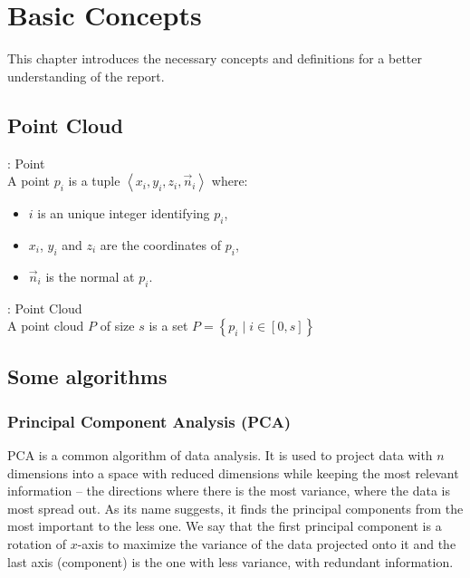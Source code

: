 \chapter{Basic Concepts}
\label{ch:background}
This chapter introduces the necessary concepts and definitions for a better understanding of the report.

\section{Point Cloud}
\begin{definition}{: Point}
  \\A point $p_i$ is a tuple $\left\langle x_i, y_i, z_i, \vec{n}_i \right\rangle$ where:
  \begin{itemize}
    \item $i$ is an unique integer identifying $p_i$,
    \item $x_i$, $y_i$ and $z_i$ are the coordinates of $p_i$,
    \item $\vec{n}_i$ is the normal at $p_i$.
  \end{itemize}
\end{definition}

\begin{definition}{: Point Cloud}
  \\A point cloud $P$ of size $s$ is a set $P = \left\lbrace p_i \mid i \in [0, s]  \right\rbrace$
\end{definition}


\section{Some algorithms}

\subsection{Principal Component Analysis (PCA)}
\label{subsc:pca}
PCA is a common algorithm of data analysis. It is used to project data with $n$ dimensions into a space with reduced dimensions while keeping the most relevant information -- the directions where there is the most variance, where the data is most spread out. As its name suggests, it finds the principal components from the most important to the less one. We say that the first principal component is a rotation of $x$-axis to maximize the variance of the data projected onto it and the last axis (component) is the one with less variance, with redundant information.

